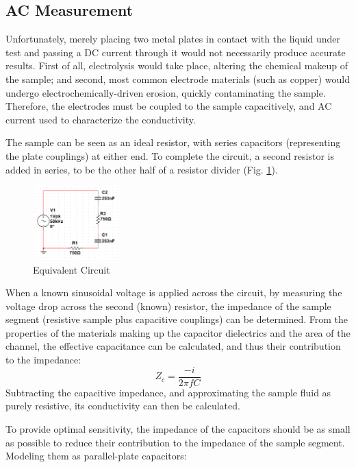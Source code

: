 \documentclass[]{article}
\begin{document}
\subsection{AC Measurement}
\par Unfortunately, merely placing two metal plates in contact with the liquid under test and passing a DC current through it would not necessarily produce accurate results. First of all, electrolysis would take place, altering the chemical makeup of the sample; and second, most common electrode materials (such as copper) would undergo electrochemically-driven erosion, quickly contaminating the sample. Therefore, the electrodes must be coupled to the sample capacitively, and AC current used to characterize the conductivity. 
\par The sample can be seen as an ideal resistor, with series capacitors (representing the plate couplings) at either end. To complete the circuit, a second resistor is added in series, to be the other half of a resistor divider (Fig. \ref{fig:equivalent_circuit}).
\begin{figure}[h!]
	\centering
	\includegraphics[width=0.3\textwidth]{Conductivity_Equivalent_Circuit}
	\caption{Equivalent Circuit}
	\label{fig:equivalent_circuit}
\end{figure}
When a known sinusoidal voltage is applied across the circuit, by measuring the voltage drop across the second (known) resistor, the impedance of the sample segment (resistive sample plus capacitive couplings) can be determined. From the properties of the materials making up the capacitor dielectrics and the area of the channel, the effective capacitance can be calculated, and thus their contribution to the impedance:
\begin{equation}
Z_c=\frac{-i}{2\pi f C}
\end{equation}
Subtracting the capacitive impedance, and approximating the sample fluid as purely resistive, its conductivity can then be calculated.
 \par To provide optimal sensitivity, the impedance of the capacitors should be as small as possible to reduce their contribution to the impedance of the sample segment. Modeling them as parallel-plate capacitors:
\end{document}
